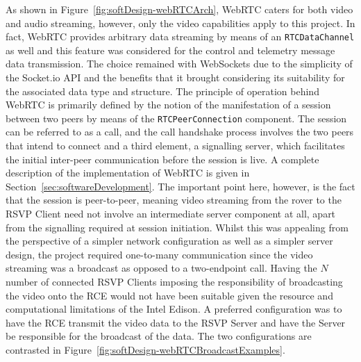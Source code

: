       As shown in Figure~\ref{fig:softDesign-webRTCArch}, WebRTC caters for both video and audio streaming, however, only the video capabilities apply to this project. In fact, WebRTC provides arbitrary data streaming by means of an \texttt{RTCDataChannel} as well and this feature was considered for the control and telemetry message data transmission. The choice remained with WebSockets due to the simplicity of the Socket.io API and the benefits that it brought considering its suitability for the associated data type and structure. The principle of operation behind WebRTC is primarily defined by the notion of the manifestation of a session between two peers by means of the \texttt{RTCPeerConnection} component. The session can be referred to as a call, and the call handshake process involves the two peers that intend to connect and a third element, a signalling server, which facilitates the initial inter-peer communication before the session is live. A complete description of the implementation of WebRTC is given in Section~\ref{sec:softwareDevelopment}. The important point here, however, is the fact that the session is peer-to-peer, meaning video streaming from the rover to the RSVP Client need not involve an intermediate server component at all, apart from the signalling required at session initiation. Whilst this was appealing from the perspective of a simpler network configuration as well as a simpler server design, the project required one-to-many communication since the video streaming was a broadcast as opposed to a two-endpoint call. Having the $N$ number of connected RSVP Clients imposing the responsibility of broadcasting the video onto the RCE would not have been suitable given the resource and computational limitations of the Intel Edison. A preferred configuration was to have the RCE transmit the video data to the RSVP Server and have the Server be responsible for the broadcast of the data. The two configurations are contrasted in Figure~\ref{fig:softDesign-webRTCBroadcastExamples}.
      
